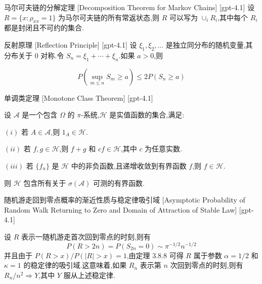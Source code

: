 \documentclass[UTF8]{ctexart}
\begin{document}
    
    
    \begin{thm}
        {马尔可夫链的分解定理}
        [Decomposition Theorem for Markov Chains]
        [gpt-4.1]
        设 $R = \{ x : \rho_{xx} = 1 \}$ 为马尔可夫链的所有常返状态,则 $R$ 可以写为 $\cup_{i} R_{i}$,其中每个 $R_{i}$ 都是封闭且不可约的集合.
    \end{thm}
    
    
    
    \begin{thm}
        {反射原理}
        [Reflection Principle]
        [gpt-4.1]
        设 $\xi_{ 1 }, \xi_{ 2 }, \ldots$ 是独立同分布的随机变量,其分布关于 $0$ 对称.令 $S_{ n } = \xi_{ 1 } + \cdots + \xi_{ n }$.如果 $a > 0$,则

\[
P \left( \sup_{ m \leq n } S_{ m } \geq a \right) \leq 2 P ( S_{ n } \geq a )
\]

    \end{thm}
    
    
    
    \begin{thm}
        {单调类定理}
        [Monotone Class Theorem]
        [gpt-4.1]
        
设 $\mathcal{A}$ 是一个包含 $\Omega$ 的 $\pi$-系统,$\mathcal{H}$ 是实值函数的集合,满足:

$(i)$ 若 $A \in \mathcal{A}$,则 $1_A \in \mathcal{H}$.

$(ii)$ 若 $f, g \in \mathcal{H}$,则 $f + g$ 和 $cf \in \mathcal{H}$,其中 $c$ 为任意实数.

$(iii)$ 若 $\{f_n\}$ 是 $\mathcal{H}$ 中的非负函数,且递增收敛到有界函数 $f$,则 $f \in \mathcal{H}$.

则 $\mathcal{H}$ 包含所有关于 $\sigma(\mathcal{A})$ 可测的有界函数.

    \end{thm}
    
    
    
    \begin{thm}
        {随机游走回到零点概率的渐近性质与稳定律吸引域}
        [Asymptotic Probability of Random Walk Returning to Zero and Domain of Attraction of Stable Law]
        [gpt-4.1]
        
设 $R$ 表示一随机游走首次回到零点的时刻,则有
\[
P(R > 2n) = P(S_{2n} = 0) \sim \pi^{-1/2} n^{-1/2}
\]
并且由于 $P(R > x) / P(|R| > x) = 1$,由定理 3.8.8 可得 $R$ 属于参数 $\alpha = 1/2$ 和 $\kappa = 1$ 的稳定律的吸引域.这意味着,如果 $R_n$ 表示第 $n$ 次回到零点的时刻,则有 $R_n / n^2 \Rightarrow Y$,其中 $Y$ 服从上述稳定律.

    \end{thm}
    
\end{document}
